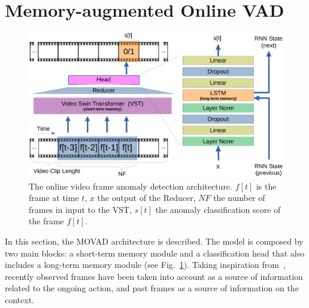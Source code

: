 \section{Memory-augmented Online VAD}
\label{sec:theory}

\fboxsep=1mm%
\fboxrule=1pt%

\begin{figure}[!t]
            \centerline{\includegraphics[clip, width=.9\linewidth]{images/arch-rx-cropped.pdf}}
        \caption{The online video frame anomaly detection architecture. $f[t]$ is the frame at time $t$, $x$ the output of the Reducer, $NF$ the number of frames in input to the VST, $s[t]$ the anomaly classification score of the frame $f[t]$.\vspace{-5mm}\label{fig:arch}}
\end{figure}

In this section, the MOVAD architecture is described.  
The model is composed by two main blocks: a short-term memory module and a classification head that also includes a long-term  memory module (see Fig.~\ref{fig:arch}). 
Taking inspiration from~\cite{xu2021long}, recently observed frames have been taken into account as a source of information related to the ongoing action, and past frames as a source of information on the context.

